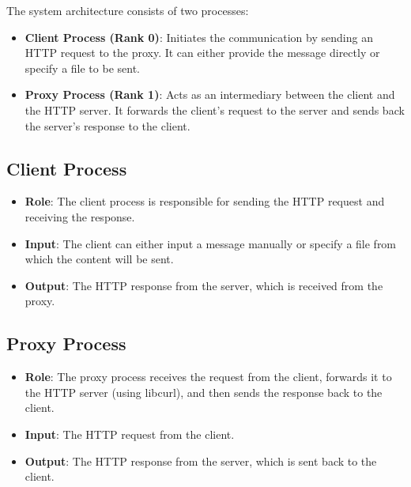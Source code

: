 \documentclass[a4paper,12pt]{article}
\begin{document}
The system architecture consists of two processes:
\begin{itemize}
    \item \textbf{Client Process (Rank 0)}: Initiates the communication by sending an HTTP request to the proxy. It can either provide the message directly or specify a file to be sent.
    \item \textbf{Proxy Process (Rank 1)}: Acts as an intermediary between the client and the HTTP server. It forwards the client's request to the server and sends back the server's response to the client.
\end{itemize}

\subsection{Client Process}
\begin{itemize}
    \item \textbf{Role}: The client process is responsible for sending the HTTP request and receiving the response.
    \item \textbf{Input}: The client can either input a message manually or specify a file from which the content will be sent.
    \item \textbf{Output}: The HTTP response from the server, which is received from the proxy.
\end{itemize}

\subsection{Proxy Process}
\begin{itemize}
    \item \textbf{Role}: The proxy process receives the request from the client, forwards it to the HTTP server (using libcurl), and then sends the response back to the client.
    \item \textbf{Input}: The HTTP request from the client.
    \item \textbf{Output}: The HTTP response from the server, which is sent back to the client.
\end{itemize}
\end{document}
